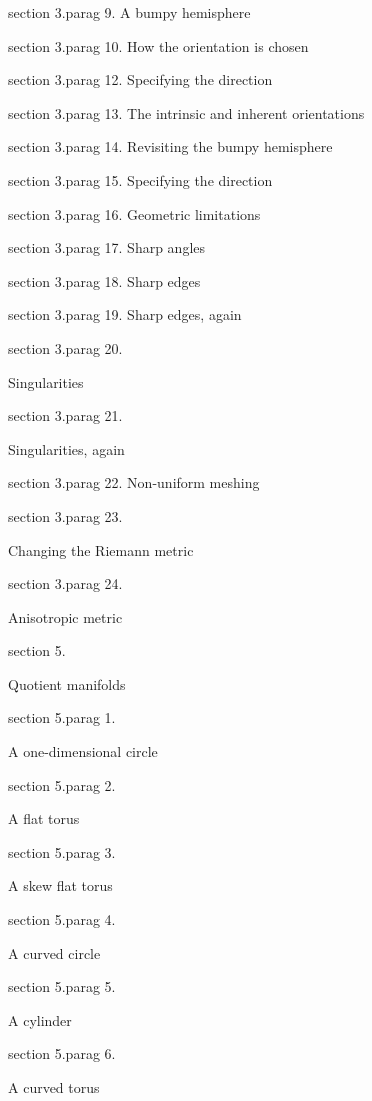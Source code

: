\numb section 3.\numb parag 9. A bumpy hemisphere

\numb section 3.\numb parag 10. How the orientation is chosen

\numb section 3.\numb parag 12. Specifying the direction

\numb section 3.\numb parag 13. The intrinsic and inherent orientations

\numb section 3.\numb parag 14. Revisiting the bumpy hemisphere

\numb section 3.\numb parag 15. Specifying the direction

\numb section 3.\numb parag 16. Geometric limitations

\numb section 3.\numb parag 17. Sharp angles

\numb section 3.\numb parag 18. Sharp edges

\numb section 3.\numb parag 19. Sharp edges, again

\numb section 3.\numb parag 20.
Singularities

\numb section 3.\numb parag 21.
Singularities, again

\numb section 3.\numb parag 22. Non-uniform meshing

\numb section 3.\numb parag 23. 
Changing the Riemann metric

\numb section 3.\numb parag 24. 
Anisotropic metric

\medskip\noindent
\numb section 5. Quotient manifolds

\numb section 5.\numb parag 1. A one-dimensional circle

\numb section 5.\numb parag 2. A flat torus

\numb section 5.\numb parag 3. A skew flat torus

\numb section 5.\numb parag 4. A curved circle

\numb section 5.\numb parag 5. A cylinder

\numb section 5.\numb parag 6. A curved torus

